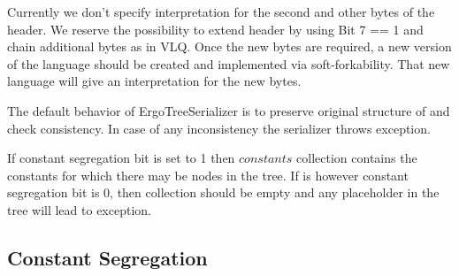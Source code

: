 Currently we don't specify interpretation for the second and other bytes of
the header. We reserve the possibility to extend header by using Bit 7 == 1
and chain additional bytes as in VLQ. Once the new bytes are required, a new
version of the language should be created and implemented via
soft-forkability. That new language will give an interpretation for the new
bytes.

The default behavior of ErgoTreeSerializer is to preserve original structure
of \ASDag and check consistency. In case of any inconsistency the
serializer throws exception.

If constant segregation bit is set to 1 then $constants$ collection contains
the constants for which there may be  nodes in the
tree. If is however constant segregation bit is 0, then 
collection should be empty and any placeholder in the tree will lead to
exception.

\subsection{Constant Segregation}
\label{sec:ser:constant_segregation}

